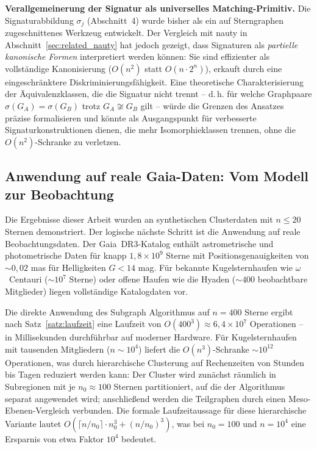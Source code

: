 ﻿\documentclass[a4paper,12pt]{report}
\theoremstyle{definition}
\begin{document}
\textbf{Verallgemeinerung der Signatur als universelles Matching-Primitiv.} Die Signaturabbildung $\sigma_j$ (Abschnitt~4) wurde bisher als ein auf Sterngraphen zugeschnittenes Werkzeug entwickelt. Der Vergleich mit nauty in Abschnitt~\ref{sec:related_nauty} hat jedoch gezeigt, dass Signaturen als \emph{partielle kanonische Formen} interpretiert werden können: Sie sind effizienter als vollständige Kanonisierung ($O(n^2)$ statt $O(n \cdot 2^n)$), erkauft durch eine eingeschränktere Diskriminierungsfähigkeit. Eine theoretische Charakterisierung der Äquivalenzklassen, die die Signatur nicht trennt -- d.\,h. für welche Graphpaare $\sigma(G_A) = \sigma(G_B)$ trotz $G_A \not\cong G_B$ gilt -- würde die Grenzen des Ansatzes präzise formalisieren und könnte als Ausgangspunkt für verbesserte Signaturkonstruktionen dienen, die mehr Isomorphieklassen trennen, ohne die $O(n^2)$-Schranke zu verletzen.

\subsection{Anwendung auf reale Gaia-Daten: Vom Modell zur Beobachtung}

Die Ergebnisse dieser Arbeit wurden an synthetischen Clusterdaten mit $n \leq 20$ Sternen demonstriert. Der logische nächste Schritt ist die Anwendung auf reale Beobachtungsdaten. Der Gaia~DR3-Katalog \cite{gaia2022} enthält astrometrische und photometrische Daten für knapp $1{,}8 \times 10^9$ Sterne mit Positionsgenauigkeiten von $\sim 0{,}02$ mas für Helligkeiten $G < 14$ mag. Für bekannte Kugelsternhaufen wie $\omega$~Centauri ($\sim 10^7$ Sterne) oder offene Haufen wie die Hyaden ($\sim 400$ beobachtbare Mitglieder) liegen vollständige Katalogdaten vor.

Die direkte Anwendung des Subgraph Algorithmus auf $n = 400$ Sterne ergibt nach Satz~\ref{satz:laufzeit} eine Laufzeit von $O(400^3) \approx 6{,}4 \times 10^7$ Operationen -- in Millisekunden durchführbar auf moderner Hardware. Für Kugelsternhaufen mit tausenden Mitgliedern ($n \sim 10^4$) liefert die $O(n^3)$-Schranke $\sim 10^{12}$ Operationen, was durch hierarchische Clusterung auf Rechenzeiten von Stunden bis Tagen reduziert werden kann: Der Cluster wird zunächst räumlich in Subregionen mit je $n_0 \approx 100$ Sternen partitioniert, auf die der Algorithmus separat angewendet wird; anschließend werden die Teilgraphen durch einen Meso-Ebenen-Vergleich verbunden. Die formale Laufzeitaussage für diese hierarchische Variante lautet $O\!\left(\lceil n / n_0 \rceil \cdot n_0^3 + (n/n_0)^3\right)$, was bei $n_0 = 100$ und $n = 10^4$ eine Ersparnis von etwa Faktor $10^4$ bedeutet.
\end{document}
